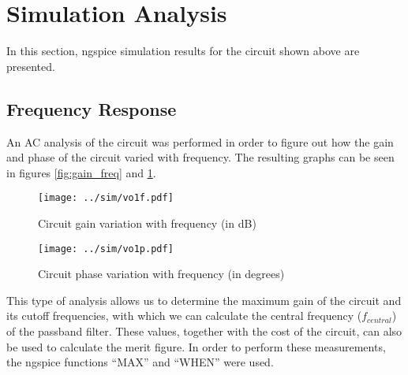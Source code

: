\newpage
\section{Simulation Analysis}
\label{sec:simulation}

In this section, ngspice simulation results for the circuit shown above are presented.


\subsection{Frequency Response}

An AC analysis of the circuit was performed in order to figure out how the gain and phase of the circuit varied with frequency. The resulting graphs can be seen in figures \ref{fig:gain_freq} and \ref{fig:phase_freq}.


\begin{figure}[H]
\centering
\begin{minipage}[H]{0.45\linewidth}
{\texttt{[image: ../sim/vo1f.pdf]}}
\caption{Circuit gain variation with frequency (in dB)}
\label{fig:gain_freq}
\end{minipage}
\quad
\begin{minipage}[H]{0.45\linewidth}
\texttt{[image: ../sim/vo1p.pdf]}
\caption{Circuit phase variation with frequency (in degrees)}
\label{fig:phase_freq}
\end{minipage}
\end{figure}




This type of analysis allows us to determine the maximum gain of the circuit and its cutoff frequencies, with which we can calculate the central frequency ($f_{central}$) of the passband filter. These values, together with the cost of the circuit, can also be used to calculate the merit figure. In order to perform these measurements, the ngspice functions ``MAX'' and ``WHEN'' were used.

